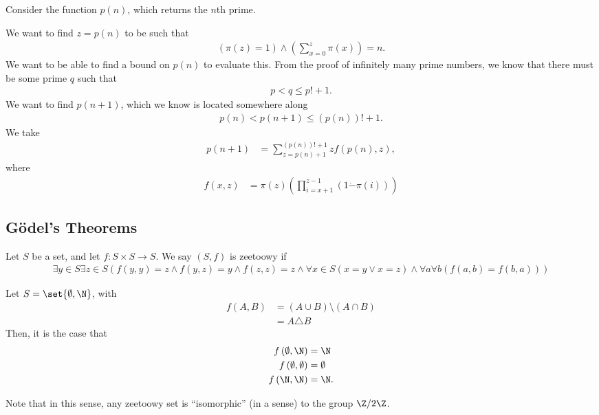 \documentclass[10pt]{mypackage}
\begin{document}
\begin{example}
  Consider the function $p(n)$, which returns the $n$th prime.\newline

  We want to find $z = p(n)$ to be such that
  \begin{align*}
    \left(\pi(z) = 1\right) \wedge \left(\sum_{x=0}^{z}\pi(x)\right) = n.
  \end{align*}
  We want to be able to find a bound on $p(n)$ to evaluate this. From the proof of infinitely many prime numbers, we know that there must be some prime $q$ such that
  \begin{align*}
    p < q \leq p! + 1.
  \end{align*}
  We want to find $p(n+1)$, which we know is located somewhere along
  \begin{align*}
    p(n) < p\left(n+1\right) \leq \left(p(n)\right)! + 1.
  \end{align*}
  We take
  \begin{align*}
    p(n+1) &= \sum_{z=p(n)+ 1}^{\left(p(n)\right)! + 1} z f\left(p(n),z\right),
  \end{align*}
  where
  \begin{align*}
    f\left(x,z\right) &= \pi(z) \left( \prod_{i=x+1}^{z-1}\left(1\dot{-}\pi(i)\right)\right)
  \end{align*}
  
\end{example}

\subsection{Gödel's Theorems}%
\begin{definition}
Let $S$ be a set, and let $f: S\times S\rightarrow S$. We say $\left(S,f\right)$ is zeetoowy if
\begin{align*}
  \exists y\in S \exists z\in S \left(f\left(y,y\right) = z \wedge f\left(y,z\right) = y \wedge f\left(z,z\right) = z \wedge \forall x\in S\left(x=y \vee x = z\right) \wedge \forall a \forall b \left(f\left(a,b\right) = f\left(b,a\right)\right)\right)
\end{align*}
\end{definition}
\begin{example}
  Let $S = \set{\emptyset,\N}$, with
  \begin{align*}
    f\left(A,B\right) &= \left(A\cup B\right)\setminus \left(A\cap B\right)\\
                      &= A\triangle B
  \end{align*}
  Then, it is the case that
  \begin{align*}
    f\left(\emptyset,\N\right) &= \N\\
    f\left(\emptyset,\emptyset\right) &= \emptyset\\
    f\left(\N,\N\right) &= \N.
  \end{align*}
\end{example}
Note that in this sense, any zeetoowy set is ``isomorphic'' (in a sense) to the group $\Z/2\Z$.\newline
\end{document}
